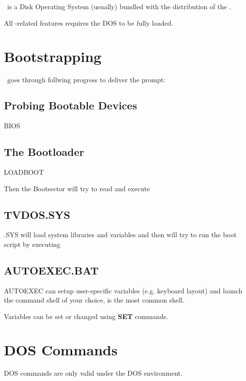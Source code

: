 \chapter{\thedos}

\thedos\ is a Disk Operating System (usually) bundled with the distribution of the \thismachine.

All \thedos-related features requires the DOS to be fully loaded.




\chapter{Bootstrapping}

\thedos\ goes through follwing progress to deliver the  prompt:

\section{Probing Bootable Devices}
BIOS

\section{The Bootloader}
LOADBOOT

Then the Bootsector will try to read and execute 

\section{TVDOS.SYS}
\thedos.SYS will load system libraries and variables and then will try to run the boot script by executing 

\section{AUTOEXEC.BAT}

AUTOEXEC can setup user-specific variables (e.g. keyboard layout) and launch the command shell of your choice,  is the most common shell.

Variables can be set or changed using \textbf{SET} commands.



\chapter{DOS Commands}

DOS commands are only valid under the DOS environment.

